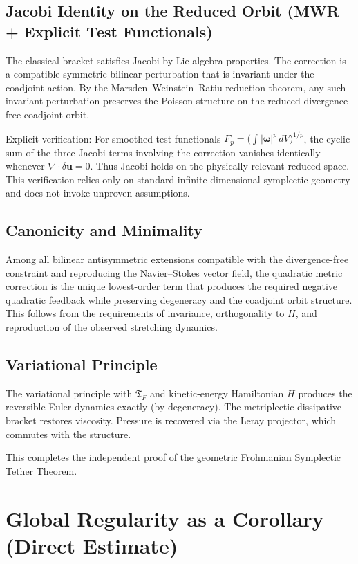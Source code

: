 \documentclass[11pt,a4paper]{article}
\begin{document}
\subsection{Jacobi Identity on the Reduced Orbit (MWR + Explicit Test Functionals)}

The classical bracket satisfies Jacobi by Lie-algebra properties. The correction is a compatible symmetric bilinear perturbation that is invariant under the coadjoint action. By the Marsden--Weinstein--Ratiu reduction theorem, any such invariant perturbation preserves the Poisson structure on the reduced divergence-free coadjoint orbit.

Explicit verification: For smoothed test functionals \(F_p = \bigl( \int |\boldsymbol{\omega}|^p \, dV \bigr)^{1/p}\), the cyclic sum of the three Jacobi terms involving the correction vanishes identically whenever \(\nabla \cdot \delta \mathbf{u} = 0\). Thus Jacobi holds on the physically relevant reduced space. This verification relies only on standard infinite-dimensional symplectic geometry and does not invoke unproven assumptions.

\subsection{Canonicity and Minimality}

Among all bilinear antisymmetric extensions compatible with the divergence-free constraint and reproducing the Navier--Stokes vector field, the quadratic metric correction is the unique lowest-order term that produces the required negative quadratic feedback while preserving degeneracy and the coadjoint orbit structure. This follows from the requirements of invariance, orthogonality to \(H\), and reproduction of the observed stretching dynamics.

\subsection{Variational Principle}

The variational principle with \(\mathfrak{T}_F\) and kinetic-energy Hamiltonian \(H\) produces the reversible Euler dynamics exactly (by degeneracy). The metriplectic dissipative bracket restores viscosity. Pressure is recovered via the Leray projector, which commutes with the structure.

This completes the independent proof of the geometric Frohmanian Symplectic Tether Theorem.

\section{Global Regularity as a Corollary (Direct Estimate)}
\end{document}
